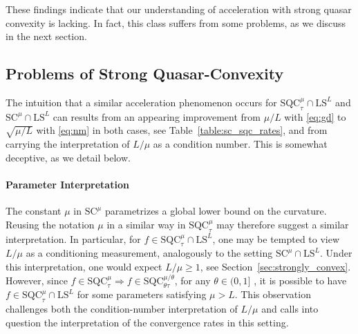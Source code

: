 \documentclass{article}
\newcommand{\sqc}{\text{SQC}_{\tau}^{\mu}}
\newcommand{\ls}{\text{LS}^{L}}
\newcommand{\strongconv}{\text{SC}^{\mu}}
\newcommand{\sqcf}[2]{\text{SQC}_{#1}^{#2}}
\theoremstyle{plain}
\theoremstyle{definition}
\theoremstyle{remark}
\begin{document}
These findings indicate that our understanding of acceleration with strong quasar convexity is lacking. In fact, this class suffers from some problems, as we discuss in the next section.
\subsection{Problems of Strong Quasar-Convexity}\label{sec:specific_pitfall}
The intuition that a similar acceleration phenomenon occurs for $\sqc \cap \ls$ and $\strongconv \cap \ls$ can results from an appearing improvement from $\mu/L$ with \eqref{eq:gd} to $\sqrt{\mu/L}$ with \eqref{eq:nm} in both cases, see Table~\ref{table:sc_sqc_rates}, and from carrying the interpretation of $L/\mu$ as a condition number. This is somewhat deceptive, as we detail below. 

\paragraph{Parameter Interpretation}
The constant $\mu$ in $\strongconv$ parametrizes a global lower bound on the curvature. Reusing the notation $\mu$ in a similar way in $\sqc$ may therefore suggest a similar interpretation. In particular, for $f \in \sqc \cap \ls$, one may be tempted to view $L/\mu$ as a conditioning measurement, analogously to the setting $\strongconv \cap \ls$. Under this interpretation, one would expect $L/\mu \ge 1$, see Section~\ref{sec:strongly_convex}. 
However, since $f \in \sqcf{\tau}{\mu} \Rightarrow f \in \sqcf{\theta \tau}{\mu/\theta}$, for any $\theta \in (0,1]$ \cite[Observation 5]{hinder2020near}, it is possible to have $f \in \sqcf{\tau}{\mu} \cap \ls$ for some parameters satisfying $\mu > L$. This observation challenges both the condition-number interpretation of $L/\mu$ and calls into question the interpretation of the convergence rates in this setting.

\end{document}
